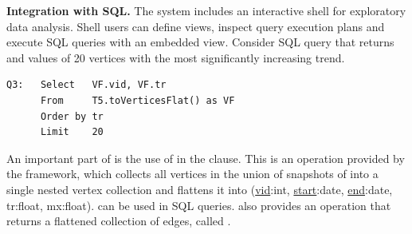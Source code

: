 {\bf Integration with SQL.} The \ql system includes an interactive
shell for exploratory data analysis.  Shell users can define
\tg views, inspect query execution plans and
execute SQL queries with an embedded \ql view.  Consider SQL query
 that returns  and 
values of 20 vertices with the most significantly increasing
 trend.


\begin{small}
\begin{verbatim}
Q3:   Select   VF.vid, VF.tr  
      From     T5.toVerticesFlat() as VF
      Order by tr
      Limit    20
\end{verbatim}
\end{small}

An important part of  is the use of
 in the  clause.  This is an
operation provided by the \ql framework, which collects all vertices
in the union of snapshots of  into a single nested vertex
collection and flattens it into  (\underline{vid}:int,
\underline{start}:date, \underline{end}:date, tr:float, mx:float).
 can be used in SQL queries.  \ql also provides an operation
that returns a flattened collection of edges, called
.
%
